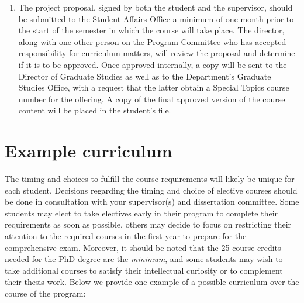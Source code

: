 \documentclass[
  letterpaper,
  DIV=11,
  numbers=noendperiod]{scrreprt}
\providecommand{\tightlist}{%
  \setlength{\itemsep}{0pt}\setlength{\parskip}{0pt}}
\begin{document}
\begin{enumerate}
\def\labelenumi{\arabic{enumi}.}
\setcounter{enumi}{2}
\tightlist
\item
  The project proposal, signed by both the student and the supervisor,
  should be submitted to the Student Affairs Office a minimum of one
  month prior to the start of the semester in which the course will take
  place. The director, along with one other person on the Program
  Committee who has accepted responsibility for curriculum matters, will
  review the proposal and determine if it is to be approved. Once
  approved internally, a copy will be sent to the Director of Graduate
  Studies as well as to the Department's Graduate Studies Office, with a
  request that the latter obtain a Special Topics course number for the
  offering. A copy of the final approved version of the course content
  will be placed in the student's file.
\end{enumerate}

\section{Example curriculum}\label{example-curriculum}

The timing and choices to fulfill the course requirements will likely be
unique for each student. Decisions regarding the timing and choice of
elective courses should be done in consultation with your supervisor(s)
and dissertation committee. Some students may elect to take electives
early in their program to complete their requirements as soon as
possible, others may decide to focus on restricting their attention to
the required courses in the first year to prepare for the comprehensive
exam. Moreover, it should be noted that the 25 course credits needed for
the PhD degree are the \emph{minimum}, and some students may wish to
take additional courses to satisfy their intellectual curiosity or to
complement their thesis work. Below we provide one example of a possible
curriculum over the course of the program:
\end{document}
